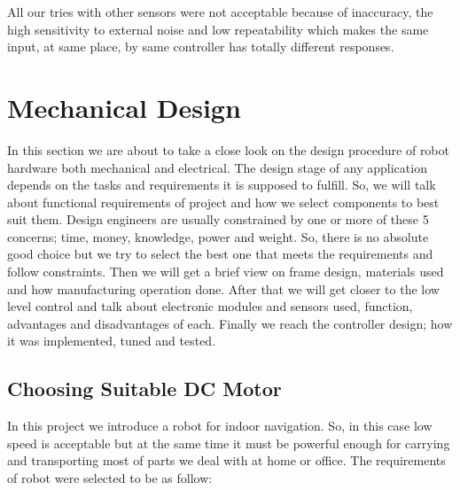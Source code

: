 \documentclass[12pt]{book}
\begin{document}
	\noindent All our tries with other sensors were not acceptable because of inaccuracy, the high sensitivity to external noise and low repeatability which makes the same input, at same place, by same controller has totally different responses. 






\chapter{Mechanical Design}
In this section we are about to take a close look on the design procedure of robot hardware both mechanical and electrical. The design stage of any application depends on the tasks and requirements it is supposed to fulfill. So, we will talk about functional requirements of project and how we select components to best suit them. Design engineers are usually constrained by one or more of these 5 concerns; time, money, knowledge, power and weight. So, there is no absolute good choice but we try to select the best one that meets the requirements and follow constraints. \cite{203} Then we will get a brief view on frame design, materials used and how manufacturing operation done. After that we will get closer to the low level control and talk about electronic modules and sensors used, function, advantages and disadvantages of each. Finally we reach the controller design; how it was implemented, tuned and tested.  

\section{Choosing Suitable DC Motor  \cite{203}}
In this project we introduce a robot for indoor navigation. So, in this case low speed is acceptable but at the same time it must be powerful enough for carrying and transporting most of parts we deal with at home or office. The requirements of robot were selected to be as follow:
\end{document}

